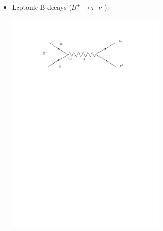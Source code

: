 \documentclass{beamer}
\begin{document}
{{  \vspace{0.1cm}
       \begin{itemize}
  \item \normalsize{Leptonic B decays ($B^{+} \rightarrow \tau^{+} \nu_{\tau}$):}
      \begin{center}
       \includegraphics[trim = 15mm 215mm 0mm 30mm, clip, width=8cm]{lepfeyn.pdf} 
       \end{center}
   \end{itemize}
  

}








}
\end{document}
